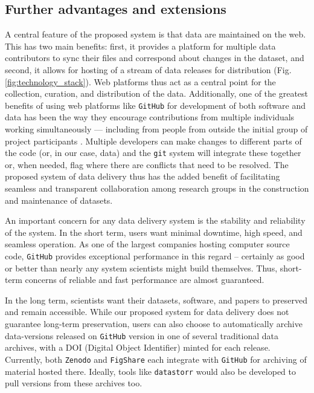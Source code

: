 \documentclass[a4paper,num-refs]{assets/oup-contemporary}
\begin{document}
\subsection{Further advantages and extensions}

A central feature of the proposed system is that data are maintained on the web. This has two main benefits: first, it provides a platform for multiple data contributors to sync their files and correspond about changes in the dataset, and second, it allows for hosting of a stream of data releases for distribution (Fig. \ref{fig:technology_stack}). Web platforms thus act as a central point for the collection, curation, and distribution of the data. Additionally, one of the greatest benefits of using web platforms like \texttt{GitHub} for development of both software and data has been the way they encourage contributions from multiple individuals working simultaneously --- including from people from outside the initial group of project participants \cite{Rogers-2013, Perkel-2016}. Multiple developers can make changes to different parts of the code (or, in our case, data) and the \texttt{git} system will integrate these together or, when needed, flag where there are conflicts that need to be resolved. The proposed system of data delivery thus has the added benefit of facilitating seamless and transparent collaboration among research groups in the construction and maintenance of datasets.

An important concern for any data delivery system is the stability and reliability of the system. In the short term, users want minimal downtime, high speed, and seamless operation. As one of the largest companies hosting computer source code, \texttt{GitHub} provides exceptional performance in this regard -- certainly as good or better than nearly any system scientists might build themselves. Thus, short-term concerns of reliable and fast performance are almost guaranteed.

In the long term, scientists want their datasets, software, and papers to preserved and remain accessible. While our proposed system for data delivery does not guarantee long-term preservation, users can also choose to automatically archive data-versions released on \texttt{GitHub} version in one of several traditional data archives, with a DOI (Digital Object Identifier) minted for each release. Currently, both \texttt{Zenodo} and  \texttt{FigShare} each integrate with \texttt{GitHub} for archiving of material hosted there. Ideally, tools like \texttt{datastorr} would also be developed to pull versions from these archives too. 
\end{document}
